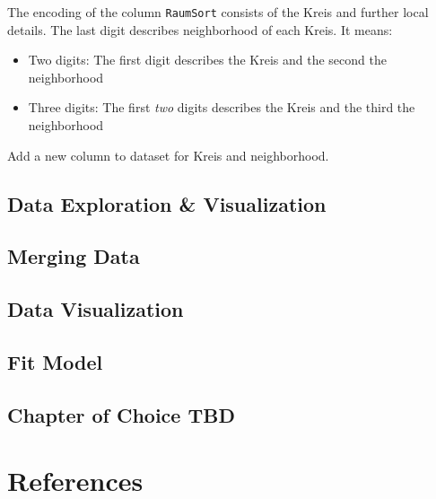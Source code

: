 \documentclass[
]{article}
\providecommand{\tightlist}{%
  \setlength{\itemsep}{0pt}\setlength{\parskip}{0pt}}
\begin{document}
The encoding of the column \texttt{RaumSort} consists of the Kreis and
further local details. The last digit describes neighborhood of each
Kreis. It means:

\begin{itemize}
\tightlist
\item
  Two digits: The first digit describes the Kreis and the second the
  neighborhood
\item
  Three digits: The first \emph{two} digits describes the Kreis and the
  third the neighborhood
\end{itemize}

Add a new column to dataset for Kreis and neighborhood.

\hypertarget{data-exploration-visualization}{%
\subsection{Data Exploration \&
Visualization}\label{data-exploration-visualization}}

\hypertarget{merging-data}{%
\subsection{Merging Data}\label{merging-data}}

\hypertarget{data-visualization}{%
\subsection{Data Visualization}\label{data-visualization}}

\hypertarget{fit-model}{%
\subsection{Fit Model}\label{fit-model}}

\hypertarget{chapter-of-choice-tbd}{%
\subsection{Chapter of Choice TBD}\label{chapter-of-choice-tbd}}

\hypertarget{references}{%
\section{References}\label{references}}
\end{document}
